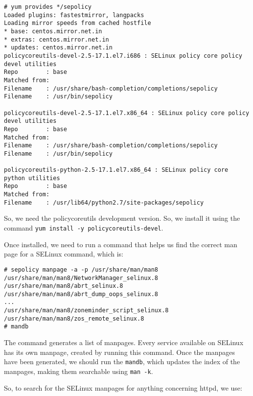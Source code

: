 \vspace{-15pt}
\begin{verbatim}
# yum provides */sepolicy
Loaded plugins: fastestmirror, langpacks
Loading mirror speeds from cached hostfile
* base: centos.mirror.net.in
* extras: centos.mirror.net.in
* updates: centos.mirror.net.in
policycoreutils-devel-2.5-17.1.el7.i686 : SELinux policy core policy devel utilities
Repo        : base
Matched from:
Filename    : /usr/share/bash-completion/completions/sepolicy
Filename    : /usr/bin/sepolicy

policycoreutils-devel-2.5-17.1.el7.x86_64 : SELinux policy core policy devel utilities
Repo        : base
Matched from:
Filename    : /usr/share/bash-completion/completions/sepolicy
Filename    : /usr/bin/sepolicy

policycoreutils-python-2.5-17.1.el7.x86_64 : SELinux policy core python utilities
Repo        : base
Matched from:
Filename    : /usr/lib64/python2.7/site-packages/sepolicy
\end{verbatim}
\vspace{-10pt}

\noindent
So, we need the policycoreutils development version. So, we install it using the command \verb|yum install -y policycoreutils-devel|. 

Once installed, we need to run a command that helps us find the correct man page for a SELinux command, which is:

\vspace{-15pt}
\begin{verbatim}
# sepolicy manpage -a -p /usr/share/man/man8
/usr/share/man/man8/NetworkManager_selinux.8
/usr/share/man/man8/abrt_selinux.8
/usr/share/man/man8/abrt_dump_oops_selinux.8
...
/usr/share/man/man8/zoneminder_script_selinux.8
/usr/share/man/man8/zos_remote_selinux.8
# mandb
\end{verbatim}
\vspace{-10pt}

\noindent
The command generates a list of manpages. Every service available on SELinux has its own manpage, created by running this command. Once the manpages have been generated, we should run the \verb|mandb|, which updates the index of the manpages, making them searchable using \verb|man -k|. 

So, to search for the SELinux manpages for anything concerning httpd, we use:

